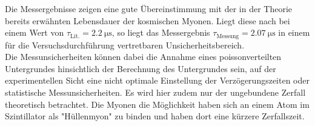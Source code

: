 \noindent Die Messergebnisse zeigen eine gute Übereinstimmung mit der in der
Theorie bereits erwähnten Lebensdauer der kosmischen Myonen. Liegt diese nach
\cite{grupen} bei einem Wert von $\tau_\text{Lit.} = \SI{2.2}{\micro\second}$,
so liegt das Messergebnis $\tau_\text{Messung} = \SI{2.07}{\micro\second}$ in
einem für die Versuchsdurchführung vertretbaren Unsicherheitsbereich. \\
Die Messunsicherheiten können dabei die Annahme eines poissonverteilten
Untergrundes hinsichtlich der Berechnung des Untergrundes sein, auf der
experimentellen Sicht eine nicht optimale Einstellung der Verzögerungszeiten
oder statistische Messunsicherheiten. Es wird hier zudem nur der ungebundene Zerfall theoretisch betrachtet.
Die Myonen die Möglichkeit haben sich an einem Atom im Szintillator als "Hüllenmyon" zu binden und
haben dort eine kürzere Zerfallszeit.
